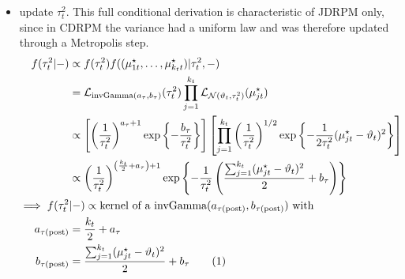 \documentclass[12pt,	%
	a4paper,		%
	twoside,		%
	openright,		%
	titlepage,%
	]{book}
\theoremstyle{definition}
\begin{document}
\begin{itemize}
\item update $\tau^2_t$. This full conditional derivation is characteristic of JDRPM only, since in CDRPM the variance had a uniform law and was therefore updated through a Metropolis step. 
\begin{align*}
f(\tau^2_t|-) & \propto  f(\tau^2_t) f((\mu^\star_{1t},\ldots,\mu^\star_{k_tt})|\tau^2_t,-)\\
& = \law_{\invgamma(a_\tau,b_\tau)}(\tau^2_t)\prod_{j=1}^{k_t} \law_{\N(\theta_t,\tau^2_t)}(\mu^\star_{jt})\\
&\propto \left[\left( \frac{1}{\tau_t^2}\right)^{a_\tau+1} \expp{-\frac{b_\tau}{\tau^2_t}}\right] \left[ \prod_{j=1}^{k_t} \left( \frac{1}{\tau^2_t}\right)^{1/2}\expp{-\frac{1}{2\tau^2_t}(\mu^\star_{jt}-\theta_t)^2}\right]\\
& \propto \left( \frac{1}{\tau^2_t}\right)^{\left( \frac{k_t}{2}+a_\tau\right)+1} \expp{-\frac{1}{\tau^2_t}\left( \frac{\sum_{j=1}^{k_t}(\mu_{jt}^\star-\theta_t)^2}{2}+b_\tau\right)}\\    
\implies f(\tau^2_t&|-)\propto \text{kernel of a $\invgamma(a_{\postp{\tau}}, b_{\postp{\tau}})$ with}\\
a_{\postp{\tau}}&=\frac{k_t}{2}+a_\tau\\
%
b_{\postp{\tau}}&= \frac{\sum_{j=1}^{k_t}(\mu_{jt}^\star-\theta_t)^2}{2}+b_\tau
\tag{\stepcounter{equation}\theequation}
\end{align*}
    


\end{itemize}
\end{document}
